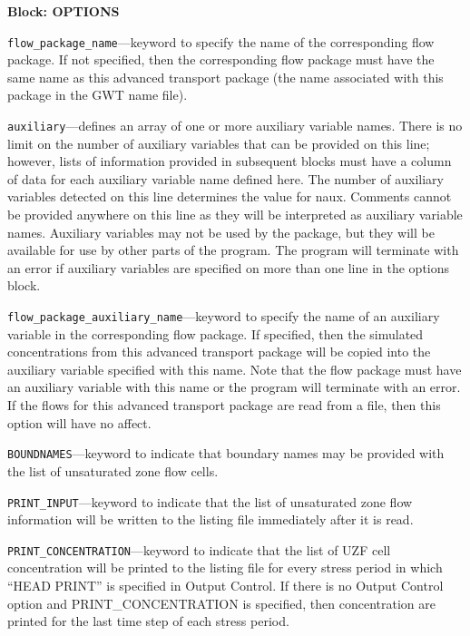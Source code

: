 
\item \textbf{Block: OPTIONS}

\begin{description}
\item \texttt{flow\_package\_name}---keyword to specify the name of the corresponding flow package.  If not specified, then the corresponding flow package must have the same name as this advanced transport package (the name associated with this package in the GWT name file).

\item \texttt{auxiliary}---defines an array of one or more auxiliary variable names.  There is no limit on the number of auxiliary variables that can be provided on this line; however, lists of information provided in subsequent blocks must have a column of data for each auxiliary variable name defined here.   The number of auxiliary variables detected on this line determines the value for naux.  Comments cannot be provided anywhere on this line as they will be interpreted as auxiliary variable names.  Auxiliary variables may not be used by the package, but they will be available for use by other parts of the program.  The program will terminate with an error if auxiliary variables are specified on more than one line in the options block.

\item \texttt{flow\_package\_auxiliary\_name}---keyword to specify the name of an auxiliary variable in the corresponding flow package.  If specified, then the simulated concentrations from this advanced transport package will be copied into the auxiliary variable specified with this name.  Note that the flow package must have an auxiliary variable with this name or the program will terminate with an error.  If the flows for this advanced transport package are read from a file, then this option will have no affect.

\item \texttt{BOUNDNAMES}---keyword to indicate that boundary names may be provided with the list of unsaturated zone flow cells.

\item \texttt{PRINT\_INPUT}---keyword to indicate that the list of unsaturated zone flow information will be written to the listing file immediately after it is read.

\item \texttt{PRINT\_CONCENTRATION}---keyword to indicate that the list of UZF cell concentration will be printed to the listing file for every stress period in which ``HEAD PRINT'' is specified in Output Control.  If there is no Output Control option and PRINT\_CONCENTRATION is specified, then concentration are printed for the last time step of each stress period.


\end{description}
